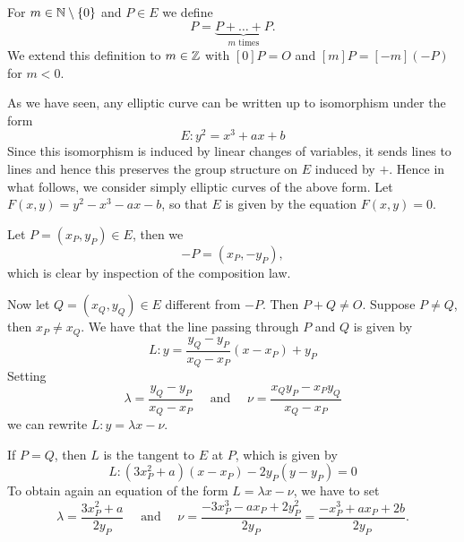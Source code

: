 
\begin{notation}
	For $m \in \mathbb{N}\setminus\{0\}$ and $P \in E$ we define
	\begin{equation*}
		[m]P = \underbrace{P + \dots + P}_{m\textrm{ times}}.
	\end{equation*}
	We extend this definition to $m \in \mathbb{Z}$ with $[0]P = O$ and
	$[m]P = [-m](-P)$ for $m < 0$.
\end{notation}

As we have seen, any elliptic curve can be written up to isomorphism
under the form
\begin{equation*}
	E: y^2 = x^3 + ax + b
\end{equation*}
Since this isomorphism is induced by linear changes of variables, it
sends lines to lines and hence this preserves the group structure on
$E$ induced by $+$. Hence in what follows, we consider simply elliptic curves of
the above form.
Let $F(x, y) = y^2 - x^3 - ax - b$, so that $E$ is given by the equation
$F(x, y) = 0$.

Let $P = (x_P, y_P) \in E$, then we
\begin{equation*}
	-P = (x_P, -y_P),
\end{equation*}
which is clear by inspection of the composition law.

Now let $Q = (x_Q, y_Q) \in E$ different from $-P$. Then $P + Q \neq O$.
Suppose $P \neq Q$, then $x_P \neq x_Q$. 
We have that the line passing through $P$ and $Q$ is given by
\begin{equation*}
	L: y = \frac{y_Q - y_P}{x_Q - x_P}(x - x_P) + y_P
\end{equation*}
Setting 
\begin{equation*}
	\lambda = \frac{y_Q - y_P}{x_Q - x_P}
	\quad\textrm{ and }\quad
	\nu = \frac{x_Qy_P - x_Py_Q}{x_Q - x_P}
\end{equation*}
we can rewrite $L: y = \lambda x - \nu$.

If $P = Q$, then $L$ is the tangent to $E$ at $P$, which is given by
\begin{equation*}
	L: (3x_P^2 + a)(x - x_P) - 2y_P(y - y_P) = 0
\end{equation*}
To obtain again an equation of the form $L = \lambda x - \nu$, we have to set
\begin{equation*}
	\lambda = \frac{3x_P^2 + a}{2y_P}
	\quad\textrm{ and }\quad
	\nu = \frac{-3x_P^3 - ax_P + 2y_P^2}{2y_P} = \frac{-x_P^3 + ax_P + 2b}{2y_P}.
\end{equation*}

